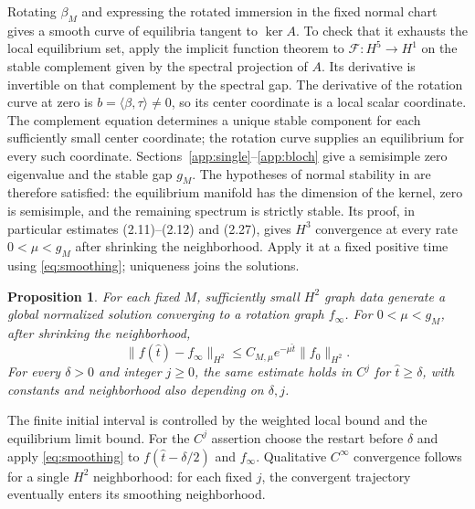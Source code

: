 \documentclass[a4paper,11pt]{article}
\numberwithin{equation}{section}
\newtheorem{proposition}[theorem]{Proposition}
\theoremstyle{definition}
\theoremstyle{remark}
\newcommand{\norm}[1]{\lVert#1\rVert}
\newcommand{\ip}[2]{\langle#1,#2\rangle}
\newcommand{\calF}{\mathcal F}
\begin{document}
Rotating $\beta_M$ and expressing the rotated immersion in the fixed normal chart gives a smooth curve of equilibria tangent to $\ker A$. To check that it exhausts the local equilibrium set, apply the implicit function theorem to $\calF:H^5\to H^1$ on the stable complement given by the spectral projection of $A$. Its derivative is invertible on that complement by the spectral gap. The derivative of the rotation curve at zero is $b=\ip\beta\tau\ne0$, so its center coordinate is a local scalar coordinate. The complement equation determines a unique stable component for each sufficiently small center coordinate; the rotation curve supplies an equilibrium for every such coordinate. Sections~\ref{app:single}--\ref{app:bloch} give a semisimple zero eigenvalue and the stable gap $g_M$. The hypotheses of normal stability in \cite[Theorem~2.1]{PSZ} are therefore satisfied: the equilibrium manifold has the dimension of the kernel, zero is semisimple, and the remaining spectrum is strictly stable. Its proof, in particular estimates (2.11)--(2.12) and (2.27), gives $H^3$ convergence at every rate $0<\mu<g_M$ after shrinking the neighborhood. Apply it at a fixed positive time using \eqref{eq:smoothing}; uniqueness joins the solutions.

\begin{proposition}\label{prop:H2}
For each fixed $M$, sufficiently small $H^2$ graph data generate a global normalized solution converging to a rotation graph $f_\infty$. For $0<\mu<g_M$, after shrinking the neighborhood,
\begin{equation}\label{eq:H2-decay}
 \norm{f(\widehat t)-f_\infty}_{H^2}\le C_{M,\mu}e^{-\mu\widehat t}\norm{f_0}_{H^2}.
\end{equation}
For every $\delta>0$ and integer $j\ge0$, the same estimate holds in $C^j$ for $\widehat t\ge\delta$, with constants and neighborhood also depending on $\delta,j$.
\end{proposition}
The finite initial interval is controlled by the weighted local bound and the equilibrium limit bound. For the $C^j$ assertion choose the restart before $\delta$ and apply \eqref{eq:smoothing} to $f(\widehat t-\delta/2)$ and $f_\infty$. Qualitative $C^\infty$ convergence follows for a single $H^2$ neighborhood: for each fixed $j$, the convergent trajectory eventually enters its smoothing neighborhood.


\end{document}
